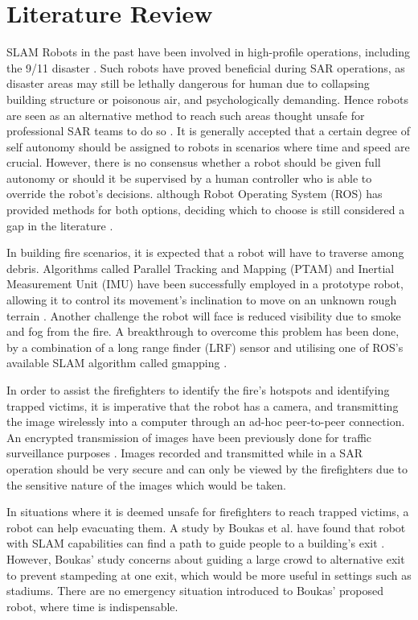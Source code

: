 \documentclass[12pt]{report}
\begin{document}
\chapter{Literature Review}
SLAM Robots in the past have been involved in high-profile operations, including the 9/11 disaster \cite{Liu}. Such robots have proved beneficial during SAR operations, as disaster areas may still be lethally dangerous for human due to collapsing building structure or poisonous air, and psychologically demanding. Hence robots are seen as an alternative method to reach such areas thought unsafe for professional SAR teams to do so \cite{Murphy}. It is generally accepted that a certain degree of self autonomy should be assigned to robots in scenarios where time and speed are crucial. However, there is no consensus whether a robot should be given full autonomy or should it be supervised by a human controller who is able to override the robot’s decisions. although Robot Operating System (ROS) has provided methods for both options, deciding which to choose is still considered a gap in the literature \cite{Mortimer}.\par
\vspace{1em}
In building fire scenarios, it is expected that a robot will have to traverse among debris. Algorithms called Parallel Tracking and Mapping (PTAM) and Inertial Measurement Unit (IMU) have been successfully employed in a prototype robot, allowing it to control its movement’s inclination to move on an unknown rough terrain \cite{Belter}. Another challenge the robot will face is reduced visibility due to smoke and fog from the fire. A breakthrough to overcome this problem has been done, by a combination of a long range finder (LRF) sensor and utilising one of ROS’s available SLAM algorithm called gmapping \cite{Santos}.\par
\vspace{1em}
In order to assist the firefighters to identify the fire’s hotspots and identifying trapped victims, it is imperative that the robot has a camera, and transmitting the image wirelessly into a computer through an ad-hoc peer-to-peer connection. An encrypted transmission of images have been previously done for traffic surveillance purposes \cite{Kougianos}. Images recorded and transmitted while in a SAR operation should be very secure and can only be viewed by the firefighters due to the sensitive nature of the images which would be taken.\par
\vspace{1em}
In situations where it is deemed unsafe for firefighters to reach trapped victims, a robot can help evacuating them. A study by Boukas et al. have found that robot with SLAM capabilities can find a path to guide people to a building’s exit \cite{Boukas}. However, Boukas’ study concerns about guiding a large crowd to alternative exit to prevent stampeding at one exit, which would be more useful in settings such as stadiums. There are no emergency situation introduced to Boukas’ proposed robot, where time is indispensable.\par
\end{document}
